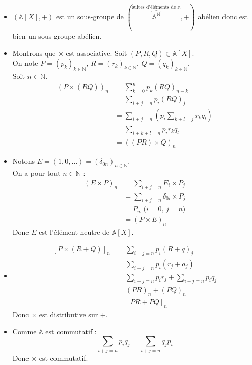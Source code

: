 \documentclass[../main.tex]{subfiles}
\begin{document}
\begin{itemize}
    \item $(\mathbb{A}[X], +)$ est un sous-groupe de $(\overbrace{\mathbb{A}^{\mathbb{N}}}^{\text{suites d'éléments de } \mathbb{A}}, +)$ abélien donc est bien un sous-groupe abélien. 
    
    \item Montrons que $\times$ est associative. Soit $(P,R,Q) \in \mathbb{A}[X]$. \\
    On note $P = (p_k)_{k \in \mathbb{N}}$, $R = (r_k)_{k \in \mathbb{N}}$, $Q = (q_k)_{k \in \mathbb{N}}$. \\
    Soit $n \in \mathbb{N}$. 
    \begin{align*}
        (P \times (RQ))_n &= \sum_{k=0}^{n} p_k (RQ)_{n-k} \\
        &= \sum_{i+j=n} p_i (RQ)_j \\
        &= \sum_{i+j=n} \left( p_i \sum_{k+l=j} r_k q_l \right) \\
        &= \sum_{i+k+l=n} p_i r_k q_l \\
        &= ((PR) \times Q)_n
    \end{align*}

    \item Notons $E = (1, 0, \ldots) = (\delta_{0n})_{n\in \mathbb{N}}$. \\
    On a pour tout $n \in \mathbb{N}$ : 
    \begin{align*}
        (E \times P)_n &= \sum_{i+j=n} E_i \times P_j \\
        &= \sum_{i+j=n} \delta_{0i}\times P_j \\
        &= P_n \text{ ($i=0$, $j=n$)} \\
        &= (P \times E)_n 
    \end{align*}
    Donc $E$ est l'élément neutre de $\mathbb{A}[X]$. 

    \item 
    \begin{align*}
        \left[ P \times (R + Q) \right]_n &= \sum_{i+j=n} p_i (R + q)_j \\
        &= \sum_{i+j=n} p_i (r_j + a_j) \\
        &= \sum_{i+j=n} p_i r_j + \sum_{i+j=n} p_i q_j \\
        &= (PR)_n + (PQ)_n \\
        &= [PR + PQ]_n
    \end{align*}
    Donc $\times$ est distributive sur $+$. 

    \item Comme $\mathbb{A}$ est commutatif : 
    $$\sum_{i+j=n} p_i q_j = \sum_{i+j=n} q_j p_i$$
    Donc $\times$ est commutatif. 
\end{itemize}
\end{document}
